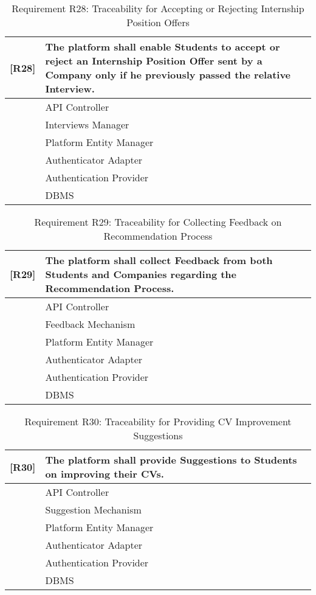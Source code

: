 \begin{table}[H]
    \centering
    \begin{tabular}{|p{1cm}|p{14cm}|}
    \hline
    \textbf{[R28]} & \textbf{The platform shall enable Students to accept or reject an Internship Position Offer sent by a Company only if he previously passed the relative Interview.} \\ \hline
    [C1] & API Controller \\ \hline
    [C6] & Interviews Manager \\ \hline
    [C10] & Platform Entity Manager \\ \hline
    [C11] & Authenticator Adapter \\ \hline
    [E3] & Authentication Provider \\ \hline
    [E4] & DBMS \\ \hline
    \end{tabular}
    \caption{Requirement R28: Traceability for Accepting or Rejecting Internship Position Offers}
    \label{tab:RT28}
\end{table}

\begin{table}[H]
    \centering
    \begin{tabular}{|p{1cm}|p{14cm}|}
    \hline
    \textbf{[R29]} & \textbf{The platform shall collect Feedback from both Students and Companies regarding the Recommendation Process.} \\ \hline
    [C1] & API Controller \\ \hline
    [C8] & Feedback Mechanism \\ \hline
    [C10] & Platform Entity Manager \\ \hline
    [C11] & Authenticator Adapter \\ \hline
    [E3] & Authentication Provider \\ \hline
    [E4] & DBMS \\ \hline
    \end{tabular}
    \caption{Requirement R29: Traceability for Collecting Feedback on Recommendation Process}
    \label{tab:RT29}
\end{table}

\begin{table}[H]
    \centering
    \begin{tabular}{|p{1cm}|p{14cm}|}
    \hline
    \textbf{[R30]} & \textbf{The platform shall provide Suggestions to Students on improving their CVs.} \\ \hline
    [C1] & API Controller \\ \hline
    [C9] & Suggestion Mechanism \\ \hline
    [C10] & Platform Entity Manager \\ \hline
    [C11] & Authenticator Adapter \\ \hline
    [E3] & Authentication Provider \\ \hline
    [E4] & DBMS \\ \hline
    \end{tabular}
    \caption{Requirement R30: Traceability for Providing CV Improvement Suggestions}
    \label{tab:RT30}
\end{table}

